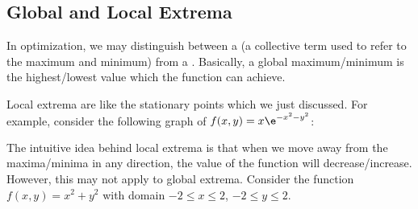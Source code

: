 \subsection{Global and Local Extrema}

In optimization, we may distinguish between a  (a collective term used to refer to the maximum and minimum) from a . Basically, a global maximum/minimum is the highest/lowest value which the function can achieve.

Local extrema are like the stationary points which we just discussed. For example, consider the following graph of $f(x, y) = x\e^{-x^2-y^2}$:

\begin{figure}[H]
    \centering
    \caption{}
\end{figure}

The intuitive idea behind local extrema is that when we move away from the maxima/minima in any direction, the value of the function will decrease/increase. However, this may not apply to global extrema. Consider the function $f(x, y) = x^2 + y^2$ with domain $-2 \leq x \leq 2$, $-2\leq y \leq 2$.

\begin{figure}[H]
    \centering
    \caption{}
\end{figure}

